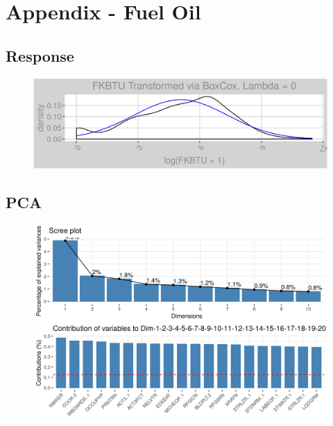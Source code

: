 \section*{Appendix - Fuel Oil}
\label{sec:appendix_fk}
\appendix
\subsection{Response}
\label{appendix:fuel_oil:response}
\begin{figure}[h]
\centering
\includegraphics[width=\textwidth, height=0.3\textheight]{Images/fuel_oil_response.png}
\end{figure}
\subsection{PCA}
\label{appendix:fuel_oil:pca}
\begin{figure}[h]
\centering
\includegraphics[width=\textwidth, height=0.3\textheight]{Images/fuel_oil_pca_vars.png}
\end{figure}
\FloatBarrier
\newpage
